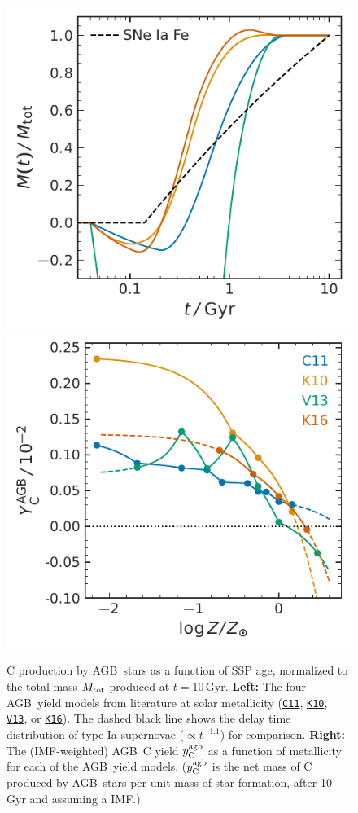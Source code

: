 \documentclass[fleqn,usenatbib]{mnras}
\newcommand{\cxi}{\texttt{\hyperlink{C11}{C11}}}
\newcommand{\kx}{\texttt{\hyperlink{K10}{K10}}}
\newcommand{\kxvi}{\texttt{\hyperlink{K16}{K16}}}
\newcommand{\vxiii}{\texttt{\hyperlink{V13}{V13}}}
\newcommand{\agb}{AGB}
\newcommand{\imf}{IMF}
\newcommand{\ssp}{SSP}
\newcommand{\Ycagb}{\ensuremath{y_{\rm C}^{\rm agb}}}
\begin{document}
\begin{figure}
    \centering
    \includegraphics{y_agb_vs_t.pdf}
    \includegraphics{y_agb_vs_z.pdf}

    \caption[]{ C production by \agb\ stars as a function of \ssp{} age, normalized to the total mass $M_{\rm tot}$ produced at $t=10$\,Gyr. \textbf{Left:} The four \agb\ yield models from literature at solar metallicity (\cxi, \kx{}, \vxiii{}, or \kxvi{}). The dashed black line shows the delay time distribution of type Ia supernovae ($\propto t^{-1.1}$) for comparison. \textbf{Right:} The (\imf-weighted) \agb\ C yield $\Ycagb$ as a function of metallicity for each of the \agb\ yield models. ($\Ycagb$ is the net mass of C produced by \agb\ stars per unit mass of star formation, after 10\,Gyr and assuming a \citealt{kroupa01} \imf.) }

    \label{fig:agb-ssp}

\end{figure}
\end{document}
